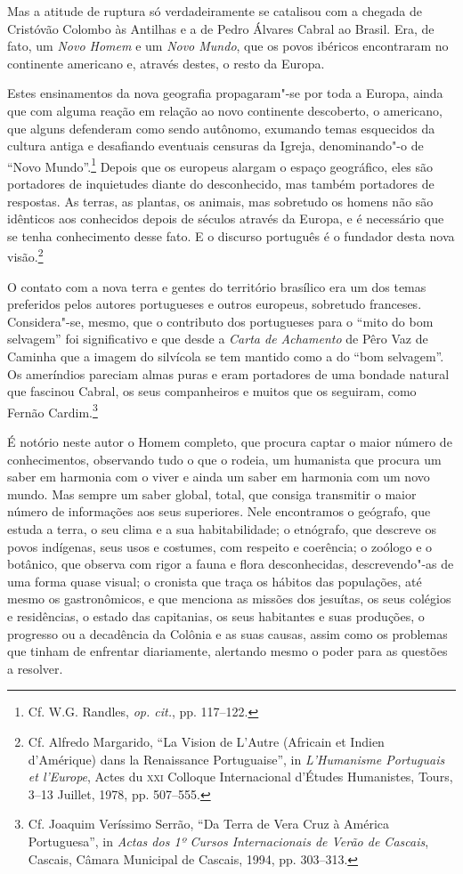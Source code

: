  Mas a atitude de ruptura só verdadeiramente se catalisou com a
chegada de Cristóvão Colombo às Antilhas e a de Pedro Álvares Cabral
ao Brasil. Era, de fato, um \textit{Novo Homem} e um \textit{Novo
Mundo}, que os povos ibéricos encontraram no continente americano e,
através destes, o resto da Europa.

Estes ensinamentos da nova geografia propagaram"-se por toda a Europa,
ainda que com alguma reação em relação ao novo continente descoberto,
o americano, que alguns defenderam como sendo autônomo, exumando temas
esquecidos da cultura antiga e desafiando eventuais censuras da
Igreja, denominando"-o de ``Novo Mundo''.\footnote{ Cf. W.G. Randles,
\textit{op. cit.}, pp. 117--122.} Depois que os europeus alargam o
espaço geográfico, eles são portadores de inquietudes diante do
desconhecido, mas também portadores de respostas. As terras, as
plantas, os animais, mas sobretudo os homens não são idênticos aos
conhecidos depois de séculos através da Europa, e é necessário que se
tenha conhecimento desse fato. E o discurso português é o fundador
desta nova visão.\footnote{ Cf. Alfredo Margarido, ``La Vision de
L'Autre (Africain et Indien d'Amérique) dans la Renaissance
Portuguaise'', in \textit{L'Humanisme Portuguais et l'Europe}, Actes
du \textsc{xxi} Colloque Internacional d'Études Humanistes, Tours, 3--13
Juillet, 1978, pp. 507--555.} 

O contato com a nova terra e gentes do território brasílico era um
dos temas preferidos pelos autores portugueses e outros europeus,
sobretudo franceses. Considera"-se, mesmo, que o contributo dos
portugueses para o ``mito do bom selvagem'' foi significativo e que
desde a \textit{Carta de Achamento} de Pêro Vaz de Caminha que a
imagem do silvícola se tem mantido como a do ``bom selvagem''. Os
ameríndios pareciam almas puras e eram portadores de uma bondade
natural que fascinou Cabral, os seus companheiros e muitos que os
seguiram, como Fernão Cardim.\footnote{ Cf. Joaquim Veríssimo
Serrão, ``Da Terra de Vera Cruz à América Portuguesa'', in
\textit{Actas dos 1º Cursos Internacionais de Verão de Cascais}, 
Cascais, Câmara Municipal de Cascais, 1994, pp. 303--313.} 

É notório neste autor o Homem completo, que procura captar o maior
número de conhecimentos, observando tudo o que o rodeia, um humanista
que procura um saber em harmonia com o viver e ainda um saber em
harmonia com um novo mundo. Mas sempre um saber global, total, que
consiga transmitir o maior número de informações aos seus superiores.
Nele encontramos o geógrafo, que estuda a terra, o seu clima e a sua
habitabilidade; o etnógrafo, que descreve os povos indígenas, seus usos
e costumes, com respeito e coerência; o zoólogo e o botânico, que
observa com rigor a fauna e flora desconhecidas, descrevendo"-as de uma
forma quase visual; o cronista que traça os hábitos das populações, até
mesmo os gastronômicos, e que menciona as missões dos jesuítas, os seus
colégios e residências, o estado das capitanias, os seus habitantes e
suas produções, o progresso ou a decadência da Colônia e as suas
causas, assim como os problemas que tinham de enfrentar diariamente,
alertando mesmo o poder para as questões a resolver.

